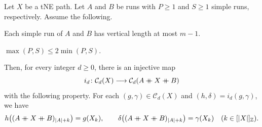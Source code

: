 \begin{lemma}\label{lem:outer-shell-extension}
Let $X$ be a tNE path. Let $A$ and $B$ be runs with $P\ge1$ and $S\ge1$
simple runs, respectively.
Assume the following.
\begin{hypotheses}
\item\label{hyp:outer-shell-lengths} Each simple run of $A$ and $B$ has vertical length at most $m-1$.
\item\label{hyp:outer-shell-counts} $\max(P,S)\le2\min(P,S)$.
\end{hypotheses}
Then, for every integer $d\ge0$, there is an injective map
\[
 i_d\colon\mathcal C_d(X)\longrightarrow\mathcal C_d(A\mathbin{+\mkern-10mu+} X\mathbin{+\mkern-10mu+} B)
\]
with the following property. For each $(g,\gamma)\in\mathcal C_d(X)$ and $(h,\delta)=i_d(g,\gamma)$, we have
\begin{equation}\label{eq:outer-extension-restriction}
 h\bigl((A\ccn X\ccn B)_{|A|+k}\bigr)=g(X_k),\qquad
 \delta\bigl((A\ccn X\ccn B)_{|A|+k}\bigr)=\gamma(X_k)
 \quad(k\in[|X|]_{\Z}).
\end{equation}
\end{lemma}
